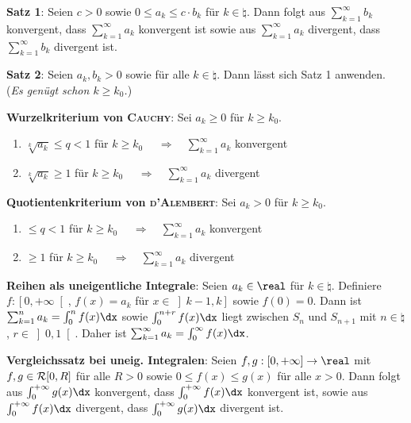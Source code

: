 \textbf{Satz 1}:
Seien $c > 0$ sowie $0 \le a_k \le c \cdot b_k$ für $k \in \natural$.
Dann folgt aus $\sum_{k=1}^\infty b_k$ konvergent, dass
$\sum_{k=1}^\infty a_k$ konvergent ist sowie aus
$\sum_{k=1}^\infty a_k$ divergent, dass
$\sum_{k=1}^\infty b_k$ divergent ist.

\textbf{Satz 2}:
Seien $a_k, b_k > 0$ sowie
 für alle
$k \in \natural$. \quad
Dann lässt sich Satz 1 anwenden. \\
(\emph{Es genügt schon $k \ge k_0$.})

\linie

\textbf{Wurzelkriterium von \textsc{Cauchy}}:
Sei $a_k \ge 0$ für $k \ge k_0$.
\begin{enumerate}
    \item $\sqrt[k]{a_k} \le q < 1$ für $k \ge k_0$
    $\quad\Rightarrow\quad \sum_{k=1}^\infty a_k$ konvergent
    
    \item $\sqrt[k]{a_k} \ge 1$ für $k \ge k_0$
    $\quad\Rightarrow\quad \sum_{k=1}^\infty a_k$ divergent
\end{enumerate}

\textbf{Quotientenkriterium von \textsc{d'Alembert}}:
Sei $a_k > 0$ für $k \ge k_0$.
\begin{enumerate}
    \item {} $\le q < 1$ für $k \ge k_0$
    $\quad\Rightarrow\quad \sum_{k=1}^\infty a_k$ konvergent
    
    \item {} $\ge 1$ für $k \ge k_0$
    $\quad\Rightarrow\quad \sum_{k=1}^\infty a_k$ divergent
\end{enumerate}

\linie

\textbf{Reihen als uneigentliche Integrale}:
Seien $a_k \in \real$ für $k \in \natural$.
Definiere $f: \left[0,+\infty\right[$, $f(x) = a_k$ für
$x \in \left]k-1,k\right]$ sowie $f(0) = 0$.
Dann ist $\sum_{k=1}^n a_k = \int_0^n f(x)\dx$ sowie
$\int_0^{n+r} f(x)\dx$ liegt zwischen $S_n$ und $S_{n+1}$ mit
$n \in \natural$, $r \in \left]0,1\right[$.
Daher ist $\sum_{k=1}^\infty a_k = \int_0^\infty f(x)\dx$.

\textbf{Vergleichssatz bei uneig. Integralen}:
Seien $f, g: [0,+\infty] \rightarrow \real$ mit $f, g \in \mathcal{R}[0, R]$ für
alle $R > 0$ sowie $0 \le f(x) \le g(x)$ für alle $x > 0$.
Dann folgt aus $\int_0^{+\infty} g(x)\dx$ konvergent, dass
$\int_0^{+\infty} f(x)\dx$ konvergent ist, sowie aus
$\int_0^{+\infty} f(x)\dx$ divergent, dass
$\int_0^{+\infty} g(x)\dx$ divergent ist.

